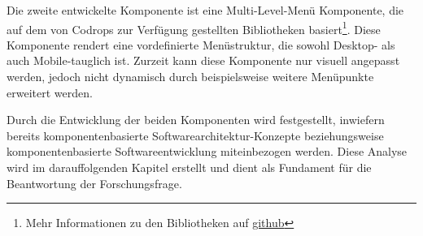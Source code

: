 Die zweite entwickelte Komponente ist eine \glqq Multi-Level\grqq -Menü Komponente, die auf dem von Codrops zur Verfügung gestellten Bibliotheken basiert\footnote{Mehr Informationen zu den Bibliotheken auf \href{https://github.com/codrops/MultiLevelPushMenu}{github}}. Diese Komponente rendert eine vordefinierte Menüstruktur, die sowohl Desktop- als auch Mobile-tauglich ist. Zurzeit kann diese Komponente nur visuell angepasst werden, jedoch nicht dynamisch durch beispielsweise weitere Menüpunkte erweitert werden.

Durch die Entwicklung der beiden Komponenten wird festgestellt, inwiefern bereits komponentenbasierte Softwarearchitektur-Konzepte beziehungsweise komponentenbasierte Softwareentwicklung miteinbezogen werden. Diese Analyse wird im darauffolgenden Kapitel erstellt und dient als Fundament für die Beantwortung der Forschungsfrage.